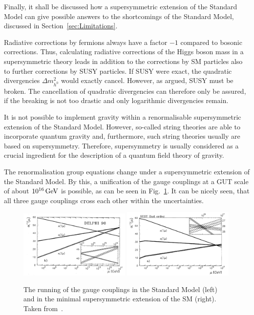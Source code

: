 Finally, it shall be discussed how a supersymmetric extension of the Standard Model can give possible answers to the shortcomings of the Standard Model, discussed in Section~\ref{sec:Limitations}.

Radiative corrections by fermions always have a factor $-1$ compared to bosonic corrections.
Thus, calculating radiative corrections of the Higgs boson mass in a supersymmetric theory leads in addition to the corrections by SM particles also to further corrections by SUSY particles.
If SUSY were exact, the quadratic divergencies $\Delta m^2_{h^0}$ would exactly cancel. 
However, as argued, SUSY must be broken.
The cancellation of quadratic divergencies can therefore only be assured, if the breaking is not too drastic and only logarithmic divergencies remain.

It is not possible to implement gravity within a renormalisable supersymmetric extension of the Standard Model.
However, so-called string theories are able to incorporate quantum gravity and, furthermore, such string theories usually are based on supersymmetry.
Therefore, supersymmetry is usually considered as a crucial ingredient for the description of a quantum field theory of gravity.


The renormalisation group equations change under a supersymmetric extension of the Standard Model.
By this, a unification of the gauge couplings at a GUT scale of about $10^{16}\,\text{Ge}\kern-0.06667em\text{V}$ is possible, as can be seen in Fig.~\ref{fig:Unification}.
It can be nicely seen, that all three gauge couplings cross each other within the uncertainties.
\begin{figure}[!b]
  \centering
      \includegraphics[width=0.49\textwidth]{figures/theory/running_couplings_SM}
      \includegraphics[width=0.49\textwidth]{figures/theory/running_couplings_MSSM}
  \caption{The running of the gauge couplings in the Standard Model (left) and in the minimal supersymmetric extension of the SM (right). Taken from~\cite{bib:Unification}.}  
  \label{fig:Unification}
\end{figure}

